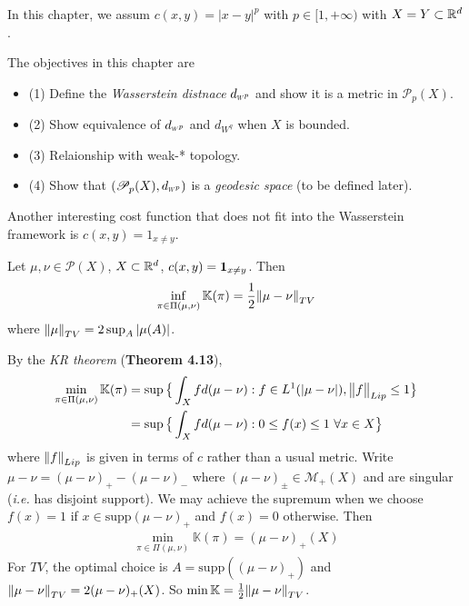 \documentclass[12pt,a4paper]{article}
\newenvironment{proof}
{\begin{changemargin}{1cm}{0.5cm} 
	}%
	{\end{changemargin}
}
\renewenvironment{i}
{\begin{itemize} 
	}%
	{\end{itemize}
}
\newenvironment{p}
{\begin{proof} 
	}%
	{\end{proof}
}
\begin{document}
In this chapter, we assum $c(x,y)  = |x-y|^p$ with $p\in [1, +\infty)$ with $X=Y \subset \mathbb{R}^d$.
\s

The objectives in this chapter are
\begin{i}
\item[(1)] Define the \emph{Wasserstein distnace} $\wa{p}$ and show it is a metric in $\mathscr{P}_p(X)$.
\item[(2)] Show equivalence of $\wa{p}$ and $d_{W^q}$ when $X$ is bounded.
\item[(3)] Relaionship with weak-* topology.
\item[(4)] Show that $(\mathscr{P}_p(X), \wa{p})$ is a \emph{geodesic space} (to be defined later).
\end{i}
\s

Another interesting cost function that does not fit into the Wasserstein framework is $c(x,y) = 1_{x\neq y}$.
\s

 Let $\mu, \nu \in \mathscr{P}(X)$, $X\subset \mathbb{R}^d$, $c(x,y) =\bm{1}_{x\neq y}$. Then
\begin{align*}
\inf_{\pi \in \Pi(\mu, \nu)} \mathbb{K}(\pi) = \frac{1}{2} \snorms{\mu - \nu}{TV}
\end{align*}
where $\snorms{\mu}{TV} = 2\sup_A |\mu(A)|$.
\begin{p}
\pf By the \emph{KR theorem} (\textbf{Theorem 4.13}),
\begin{align*}
\min_{\pi \in \Pi(\mu, \nu)} \mathbb{K}(\pi ) &= \sup \big\{ \int_X fd(\mu - \nu) : f\in L^1(|\mu-\nu|), \bigl\lVert f\bigr\rVert_{Lip} \leq 1 \big\} \\
&= \sup \big\{ \int_X fd(\mu - \nu) : 0\leq f(x)\leq 1 \,\, \forall x\in X \big\}
\end{align*}
where $\snorms{f}{Lip}$ is given in terms of $c$ rather than a usual metric. Write $\mu - \nu = (\mu - \nu)_+ - (\mu - \nu )_-$ where $(\mu - \nu )_{\pm} \in \mathscr{M}_+(X)$ and are singular (\textit{i.e.} has disjoint support). We may achieve the supremum when we choose $f(x) = 1$ if $x\in \text{supp}(\mu - \nu )_+$ and $f(x)=0$ otherwise. Then 
\begin{align*}
\min_{\pi \in \Pi(\mu, \nu)}\mathbb{K}(\pi) = (\mu - \nu )_+ (X)
\end{align*}
For $TV$, the optimal choice is $A = \text{supp}((\mu - \nu )_+)$ and $\snorms{\mu- \nu}{TV} =2(\mu - \nu )_+ (X)$. So $\min \mathbb{K} = \frac{1}{2} \snorms{\mu - \nu }{TV}$.

\eop
\end{p}
\end{document}
